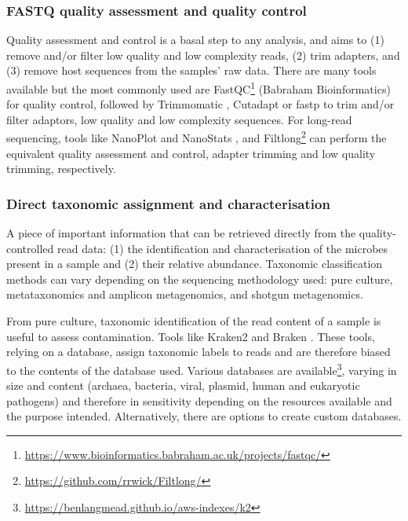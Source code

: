 \subsubsection{FASTQ quality assessment and quality control} \label{ssec:_intro_fastq_quality}

Quality assessment and control is a basal step to any analysis, and aims to (1) remove and/or filter low quality and low complexity reads, (2) trim adapters, and (3) remove host sequences from the samples’ raw data. There are many tools available but the most commonly used are FastQC\footnote{\url{https://www.bioinformatics.babraham.ac.uk/projects/fastqc/}} (Babraham Bioinformatics) for quality control, followed by Trimmomatic \citep{bolger_trimmomatic_2014}, Cutadapt \citep{martin_cutadapt_2011} or fastp \citep{chen_fastp_2018} to trim and/or filter adaptors, low quality and low complexity sequences. For long-read sequencing, tools like NanoPlot and NanoStats \citep{de_coster_nanopack_2018}, and Filtlong\footnote{\url{https://github.com/rrwick/Filtlong/}} can perform the equivalent quality assessment and control, adapter trimming and low quality trimming, respectively. 

\subsubsection{Direct taxonomic assignment and characterisation} \label{sssec:_intro_taxonomic_assignment}

A piece of important information that can be retrieved directly from the quality-controlled read data: (1) the identification and characterisation of the microbes present in a sample and (2) their relative abundance. Taxonomic classification methods can vary depending on the sequencing methodology used: pure culture, metataxonomics and amplicon metagenomics, and shotgun metagenomics.

From pure culture, taxonomic identification of the read content of a sample is useful to assess contamination. Tools like Kraken2 \citep{wood_kraken_2014, wood_improved_2019} and Braken \citep{lu_bracken_2017}. These tools, relying on a database, assign taxonomic labels to reads and are therefore biased to the contents of the database used. Various databases are available\footnote{\url{https://benlangmead.github.io/aws-indexes/k2}}, varying in size and content (archaea, bacteria, viral, plasmid, human and eukaryotic pathogens) and therefore in sensitivity depending on the resources available and the purpose intended. Alternatively, there are options to create custom databases.  

